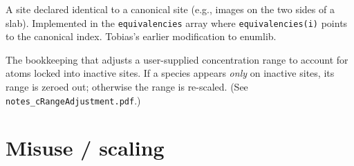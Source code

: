 \documentclass[11pt]{article}
\begin{document}
\begin{description}[leftmargin=2em, style=nextline]
\item[Equivalent site]
A site declared identical to a canonical site (e.g., images on the
two sides of a slab). Implemented in the \texttt{equivalencies} array
where \texttt{equivalencies(i)} points to the canonical index. Tobias's
earlier modification to enumlib.

\item[Concentration range adjustment]
The bookkeeping that adjusts a user-supplied concentration range to
account for atoms locked into inactive sites. If a species appears
\emph{only} on inactive sites, its range is zeroed out; otherwise the
range is re-scaled.
(See \texttt{notes\_cRangeAdjustment.pdf}.)
\end{description}

\section{Misuse / scaling}
\end{document}
